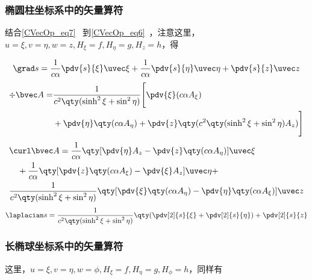 \subsubsection{椭圆柱坐标系中的矢量算符}
结合\autoref{CVecOp_eq7}~ 到\autoref{CVecOp_eq6}~，注意这里，$u=\xi,v=\eta,w=z,H_\xi=f,H_\eta=g,H_z=h$，得

\begin{equation}
\grad s = \frac{1}{c\alpha} \pdv{s}{\xi}\uvec \xi + \frac{1}{c\alpha}\pdv{s}{\eta} \uvec \eta +  \pdv{s}{z}\uvec z
\end{equation}
\begin{equation}
\begin{aligned}
\div \bvec A = &\frac{1}{c^2\qty(\sinh^2\xi+\sin^2\eta)}\Bigg[\pdv{\xi}(c\alpha A_\xi) \\&+ \pdv{\eta}\qty(c\alpha A_\eta) + \pdv{z}\qty(c^2\qty(\sinh^2\xi+\sin^2\eta)A_z)\Bigg]
\end{aligned}
\end{equation}
\begin{equation}
\begin{aligned}
&\curl \bvec A = \frac{1}{c\alpha}\qty[\pdv{\eta}A_z - \pdv{z}\qty(c\alpha A_\eta)]\uvec \xi\\
&\quad + \frac{1}{c\alpha}\qty[\pdv{z}\qty(c\alpha A_\xi) - \pdv{\xi}A_z]\uvec \eta
+ \\
&\frac{1}{c^2\qty(\sinh^2\xi+\sin^2\eta)}\qty[\pdv{\xi}\qty(c\alpha A_\eta) - \pdv{\eta}\qty(c\alpha A_\xi)]\uvec z
\end{aligned}
\end{equation}
\begin{equation}
\laplacian s = \frac{1}{c^2\qty(\sinh^2\xi+\sin^2\eta)}\qty(\pdv[2]{s}{\xi} + \pdv[2]{s}{\eta} )+ \pdv[2]{s}{z}
\end{equation}

\subsubsection{长椭球坐标系中的矢量算符}
这里，$u=\xi,v=\eta,w=\phi,H_\xi=f,H_\eta=g,H_\phi=h$，同样有

